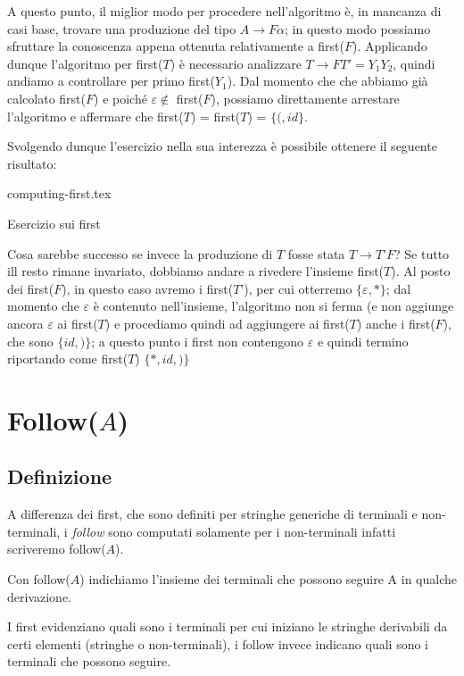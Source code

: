 \documentclass[class=book, crop=false, oneside, 12pt]{standalone}
\begin{document}
A questo punto, il miglior modo per procedere nell'algoritmo è, in mancanza di casi base, trovare una produzione del tipo \(A \rightarrow F\alpha\); in questo modo possiamo sfruttare la conoscenza appena ottenuta relativamente a first(\(F\)). Applicando dunque l'algoritmo per first(\(T\)) è necessario analizzare \(T \rightarrow FT' = Y_1Y_2\), quindi andiamo a controllare per primo first(\(Y_1\)). Dal momento che che abbiamo già calcolato first(\(F\)) e poiché \(\varepsilon \notin\) first(\(F\)), possiamo direttamente arrestare l'algoritmo e affermare che first(\(T\)) = first(\(T\)) = \(\{(, id\}\).

Svolgendo dunque l'esercizio nella sua interezza è possibile ottenere il seguente risultato:

\begin{table}[H]
	\centering
	{computing-first.tex}
    \caption{Esercizio sui first}
    \label{computing-first}
\end{table}

Cosa sarebbe successo se invece la produzione di \(T\) fosse stata \(T \to T’F\)? Se tutto ill resto rimane invariato, dobbiamo andare a rivedere l'insieme first(\(T\)). Al posto dei first(\(F\)), in questo caso avremo i first(\(T’\)), per cui otterremo \(\{\varepsilon, \ast\}\); dal momento che \(\varepsilon\) è contenuto nell'insieme, l’algoritmo non si ferma (e non aggiunge ancora \(\varepsilon\) ai first(\(T\)) e procediamo quindi ad aggiungere ai first(\(T\)) anche i first(\(F\)), che sono \(\{id, )\}\); a questo punto i first non contengono \(\varepsilon\) e quindi termino riportando come first(\(T\)) \(\{\ast, id, )\}\)

\section{Follow(\(A\))}
\subsection{Definizione}
A differenza dei first, che sono definiti per stringhe generiche di terminali e non-terminali, i \emph{follow} sono computati solamente per i non-terminali infatti scriveremo follow(\(A\)).
\begin{definition}
    Con follow(\(A\)) indichiamo l'insieme dei terminali che possono seguire A in qualche derivazione.    
\end{definition}
I first evidenziano quali sono i terminali per cui iniziano le stringhe derivabili da certi elementi (stringhe o non-terminali), i follow invece indicano quali sono i terminali che possono seguire.
\end{document}
